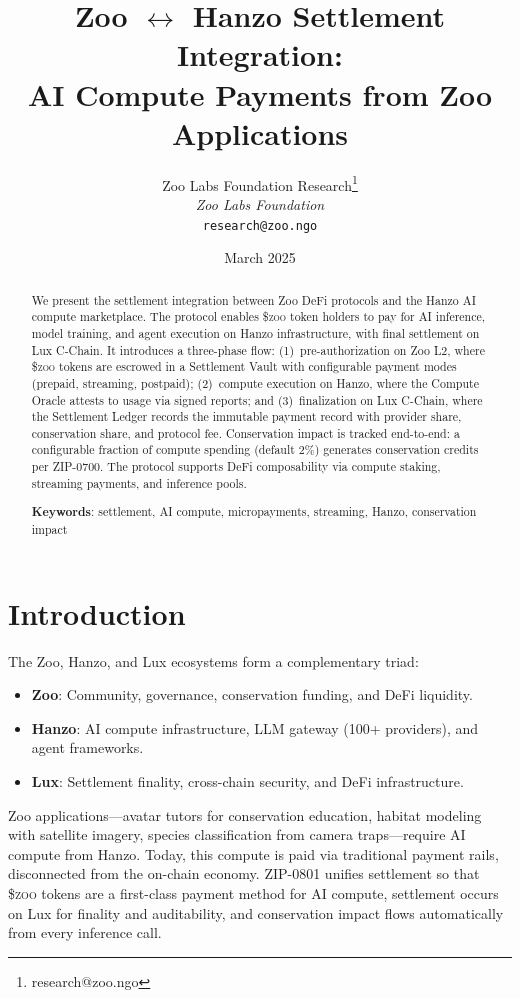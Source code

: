 \documentclass[11pt,letterpaper]{article}
\title{\textbf{Zoo $\leftrightarrow$ Hanzo Settlement Integration:\\AI Compute Payments from Zoo Applications}}
\author{
Zoo Labs Foundation Research\thanks{research@zoo.ngo}\\
\textit{Zoo Labs Foundation}\\
\texttt{research@zoo.ngo}
}
\date{March 2025}
\newcommand{\ZOO}{\$\textsc{zoo}}
\begin{document}
\zoocoverpage

\begin{abstract}
We present the settlement integration between Zoo DeFi protocols and the Hanzo AI compute marketplace. The protocol enables \ZOO{} token holders to pay for AI inference, model training, and agent execution on Hanzo infrastructure, with final settlement on Lux C-Chain. It introduces a three-phase flow: (1)~pre-authorization on Zoo L2, where \ZOO{} tokens are escrowed in a Settlement Vault with configurable payment modes (prepaid, streaming, postpaid); (2)~compute execution on Hanzo, where the Compute Oracle attests to usage via signed reports; and (3)~finalization on Lux C-Chain, where the Settlement Ledger records the immutable payment record with provider share, conservation share, and protocol fee. Conservation impact is tracked end-to-end: a configurable fraction of compute spending (default 2\%) generates conservation credits per ZIP-0700. The protocol supports DeFi composability via compute staking, streaming payments, and inference pools.

\textbf{Keywords}: settlement, AI compute, micropayments, streaming, Hanzo, conservation impact
\end{abstract}

\section{Introduction}

The Zoo, Hanzo, and Lux ecosystems form a complementary triad:

\begin{itemize}
    \item \textbf{Zoo}: Community, governance, conservation funding, and DeFi liquidity.
    \item \textbf{Hanzo}: AI compute infrastructure, LLM gateway (100+ providers), and agent frameworks.
    \item \textbf{Lux}: Settlement finality, cross-chain security, and DeFi infrastructure.
\end{itemize}

Zoo applications---avatar tutors for conservation education, habitat modeling with satellite imagery, species classification from camera traps---require AI compute from Hanzo. Today, this compute is paid via traditional payment rails, disconnected from the on-chain economy. ZIP-0801 unifies settlement so that \ZOO{} tokens are a first-class payment method for AI compute, settlement occurs on Lux for finality and auditability, and conservation impact flows automatically from every inference call.
\end{document}
